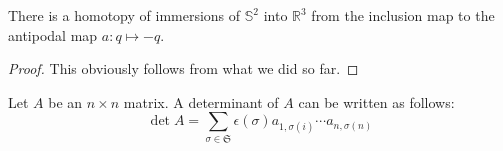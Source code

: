 %

\begin{theorem}[Smale 1958]
  \label{thm:sphere_eversion}
  \leanok
  There is a homotopy of immersions of $𝕊^2$ into $ℝ^3$ from the inclusion map to
  the antipodal map $a : q ↦ -q$.
\end{theorem}

\begin{proof}
  \leanok
  This obviously follows from what we did so far.
\end{proof}

\begin{theorem}
  Let $A$ be an $n \times n$ matrix. A determinant of $A$ can be written as follows:
$$
  \det A = \sum_{\sigma \in \mathfrak{S}} \epsilon (\sigma) a_{1,\sigma(i)} \cdots a_{n,\sigma (n)}
$$
\end{theorem}
